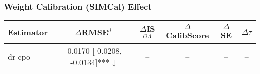 \subsubsection{Weight Calibration (SIMCal) Effect}
\begin{tabular}{l|ccccc}
\toprule
Estimator & $\Delta$RMSE$^d$ & $\Delta$IS$^{OA}$ & $\Delta$CalibScore & $\Delta$SE & $\Delta\tau$ \\
\midrule
dr-cpo & -0.0170 [-0.0208, -0.0134]*** ↓ & -- & -- & -- & -- \\
\bottomrule
\end{tabular}